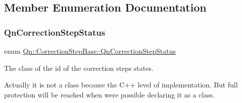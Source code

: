 \subsection{Member Enumeration Documentation}
\mbox{\label{classQn_1_1CorrectionStepBase_a95ce2afbf677e1303b632df2399c8620}} 
\subsubsection{\texorpdfstring{Qn\+Correction\+Step\+Status}{QnCorrectionStepStatus}}
{\footnotesize\ttfamily enum \mbox{\hyperlink{classQn_1_1CorrectionStepBase_a95ce2afbf677e1303b632df2399c8620}{Qn\+::\+Correction\+Step\+Base\+::\+Qn\+Correction\+Step\+Status}}}



The class of the id of the correction steps states. 

Actually it is not a class because the C++ level of implementation. But full protection will be reached when were possible declaring it as a class.

